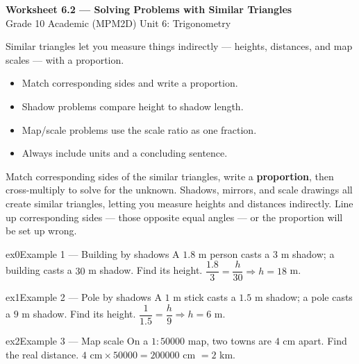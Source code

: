 \documentclass[11pt]{article}
\begin{document}
\begin{center}
{\LARGE\bfseries\color{titleblue}Worksheet 6.2 --- Solving Problems with Similar Triangles}\\[2pt]
{\small Grade 10 Academic (MPM2D) \textperiodcentered{} Unit 6: Trigonometry}
\end{center}

\begin{ideabox}
Similar triangles let you measure things indirectly --- heights, distances, and map scales --- with a proportion.
\begin{itemize}[leftmargin=*,itemsep=2pt]
  \item Match corresponding sides and write a proportion.
  \item Shadow problems compare height to shadow length.
  \item Map/scale problems use the scale ratio as one fraction.
  \item Always include units and a concluding sentence.
\end{itemize}
\end{ideabox}

\begin{learnbox}
Match corresponding sides of the similar triangles, write a \textbf{proportion}, then cross-multiply to solve for the unknown.
Shadows, mirrors, and scale drawings all create similar triangles, letting you measure heights and distances indirectly.
Line up corresponding sides — those opposite equal angles — or the proportion will be set up wrong.
\end{learnbox}


\begin{example}{ex0}{Example 1 --- Building by shadows}
A $1.8$ m person casts a $3$ m shadow; a building casts a $30$ m shadow. Find its height.
\soln $\dfrac{1.8}{3}=\dfrac{h}{30}\Rightarrow h=18$ m.
\end{example}

\begin{example}{ex1}{Example 2 --- Pole by shadows}
A $1$ m stick casts a $1.5$ m shadow; a pole casts a $9$ m shadow. Find its height.
\soln $\dfrac{1}{1.5}=\dfrac{h}{9}\Rightarrow h=6$ m.
\end{example}

\begin{example}{ex2}{Example 3 --- Map scale}
On a $1:50000$ map, two towns are $4$ cm apart. Find the real distance.
\soln $4\text{ cm}\times50000=200000$ cm $=2$ km.
\end{example}
\end{document}
